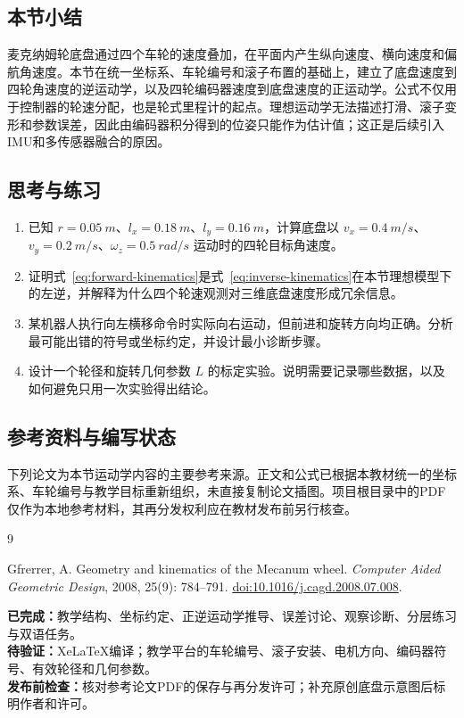 \documentclass[UTF8,zihao=-4]{ctexart}
\begin{document}
\subsection*{本节小结}

麦克纳姆轮底盘通过四个车轮的速度叠加，在平面内产生纵向速度、横向速度和偏航角速度。本节在统一坐标系、车轮编号和滚子布置的基础上，建立了底盘速度到四轮角速度的逆运动学，以及四轮编码器速度到底盘速度的正运动学。公式不仅用于控制器的轮速分配，也是轮式里程计的起点。理想运动学无法描述打滑、滚子变形和参数误差，因此由编码器积分得到的位姿只能作为估计值；这正是后续引入IMU和多传感器融合的原因。

\subsection*{思考与练习}

\begin{enumerate}
  \item 已知 $r=\SI{0.05}{m}$、$l_x=\SI{0.18}{m}$、$l_y=\SI{0.16}{m}$，计算底盘以 $v_x=\SI{0.4}{m/s}$、$v_y=\SI{0.2}{m/s}$、$\omega_z=\SI{0.5}{rad/s}$ 运动时的四轮目标角速度。
  \item 证明式~\eqref{eq:forward-kinematics}是式~\eqref{eq:inverse-kinematics}在本节理想模型下的左逆，并解释为什么四个轮速观测对三维底盘速度形成冗余信息。
  \item 某机器人执行向左横移命令时实际向右运动，但前进和旋转方向均正确。分析最可能出错的符号或坐标约定，并设计最小诊断步骤。
  \item 设计一个轮径和旋转几何参数 $L$ 的标定实验。说明需要记录哪些数据，以及如何避免只用一次实验得出结论。
\end{enumerate}

\subsection*{参考资料与编写状态}

下列论文为本节运动学内容的主要参考来源。正文和公式已根据本教材统一的坐标系、车轮编号与教学目标重新组织，未直接复制论文插图。项目根目录中的PDF仅作为本地参考材料，其再分发权利应在教材发布前另行核查。

\begin{thebibliography}{9}

Gfrerrer, A.
Geometry and kinematics of the Mecanum wheel.
\emph{Computer Aided Geometric Design}, 2008, 25(9): 784--791.
\href{https://doi.org/10.1016/j.cagd.2008.07.008}{doi:10.1016/j.cagd.2008.07.008}.

\end{thebibliography}

\noindent
\textbf{已完成：}教学结构、坐标约定、正逆运动学推导、误差讨论、观察诊断、分层练习与双语任务。\\
\textbf{待验证：}XeLaTeX编译；教学平台的车轮编号、滚子安装、电机方向、编码器符号、有效轮径和几何参数。\\
\textbf{发布前检查：}核对参考论文PDF的保存与再分发许可；补充原创底盘示意图后标明作者和许可。
\end{document}

